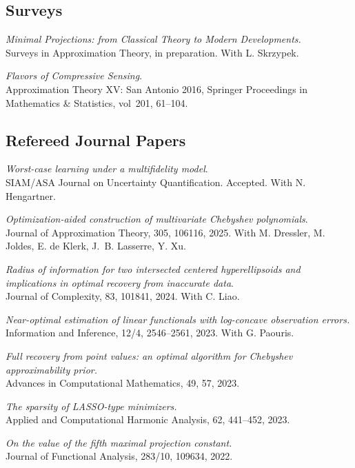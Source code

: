 \documentclass[11pt]{article}
\begin{document}
\subsection{Surveys}
\betaremune
\item {\sl Minimal Projections:
from Classical Theory to Modern Developments.}\\
Surveys in Approximation Theory, in preparation. With L. Skrzypek.
\item {\sl Flavors of Compressive Sensing}.\\
Approximation Theory XV: San Antonio 2016,
Springer Proceedings in Mathematics \& Statistics,
vol~201, 61--104. 
\eetaremune

\subsection{Refereed Journal Papers}
\betaremune
\item {\sl Worst-case learning under a multifidelity model}.\\
SIAM/ASA Journal on Uncertainty Quantification. Accepted. With N. Hengartner.
\item {\sl Optimization-aided construction of multivariate Chebyshev polynomials}.\\
Journal of Approximation Theory, 305, 106116, 2025. With M.  Dressler, M.  Joldes, E. de Klerk, J.~B. Lasserre,  Y. Xu.
\item {\sl Radius of information for two intersected centered hyperellipsoids and implications in optimal recovery from inaccurate data}. \\
Journal of Complexity, 83, 101841, 2024. With C. Liao.
\item {\sl Near-optimal estimation of linear functionals with log-concave observation errors.}\\
Information and Inference, 12/4, 2546--2561, 2023.  
With G. Paouris.
\item {\sl Full recovery from point values: an optimal algorithm for Chebyshev approximability prior.}\\
Advances in Computational Mathematics,  49, 57, 2023.	
\item {\sl The sparsity of LASSO-type minimizers.}\\
Applied and Computational Harmonic Analysis, 62, 441--452, 2023.
\item {\sl On the value of the fifth maximal projection constant.}\\
Journal of Functional Analysis, 283/10, 109634, 2022.
\end{document}
